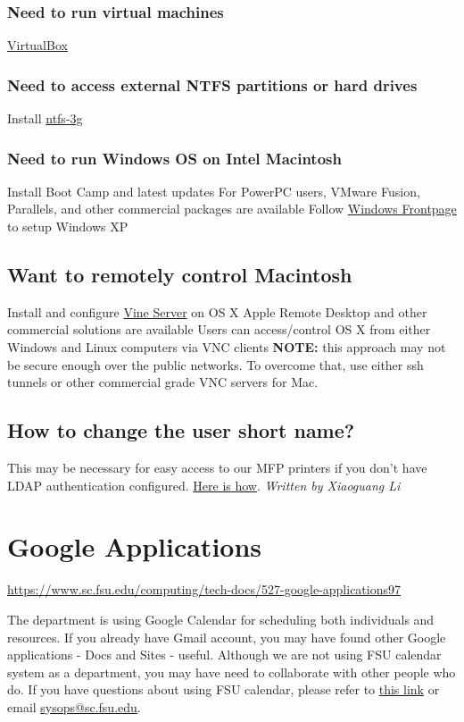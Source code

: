 \documentclass[12pt,a4paper]{article}
\begin{document}
\subsubsection*{Need to run virtual machines}
\href{http://www.virtualbox.org/}{VirtualBox}
\subsubsection*{Need to access external NTFS partitions or hard drives}
Install \href{http://www.tuxera.com/mac/ntfs-3g_faq.html}{ntfs-3g}
\subsubsection*{Need to run Windows OS on Intel Macintosh}
Install Boot Camp and latest updates
For PowerPC users, VMware Fusion, Parallels, and other commercial packages are available
Follow \href{https://www.sc.fsu.edu/computing/tech-docs/447-windows-frontpage}{Windows Frontpage} to setup Windows XP

\subsection*{Want to remotely control Macintosh}
Install and configure \href{http://www.redstonesoftware.com/products/vine_server}{Vine Server} on OS X
Apple Remote Desktop and other commercial solutions are available
Users can access/control OS X from either Windows and Linux computers via VNC clients
\textbf{NOTE:} this approach may not be secure enough over the public networks. To overcome that, use either ssh tunnels or other commercial grade VNC servers for Mac.

\subsection*{How to change the user short name?}
This may be necessary for easy access to our MFP printers if you don't have LDAP authentication configured. \href{http://docs.info.apple.com/article.html?artnum=106915}{Here is how}.
\hfill \textit{Written by Xiaoguang Li}

\section{Google Applications}
\url{https://www.sc.fsu.edu/computing/tech-docs/527-google-applications97}

The department is using Google Calendar for scheduling both individuals and resources. If you already have Gmail account, you may have found other Google applications - Docs and Sites - useful. Although we are not using FSU calendar system as a department, you may have need to collaborate with other people who do. If you have questions about using FSU calendar, please refer to \href{https://www.sc.fsu.edu/computing/tech-docs/243-fsu-calendar}{this link} or email \href{mailto:sysops@sc.fsu.edu}{sysops@sc.fsu.edu}.
\end{document}
